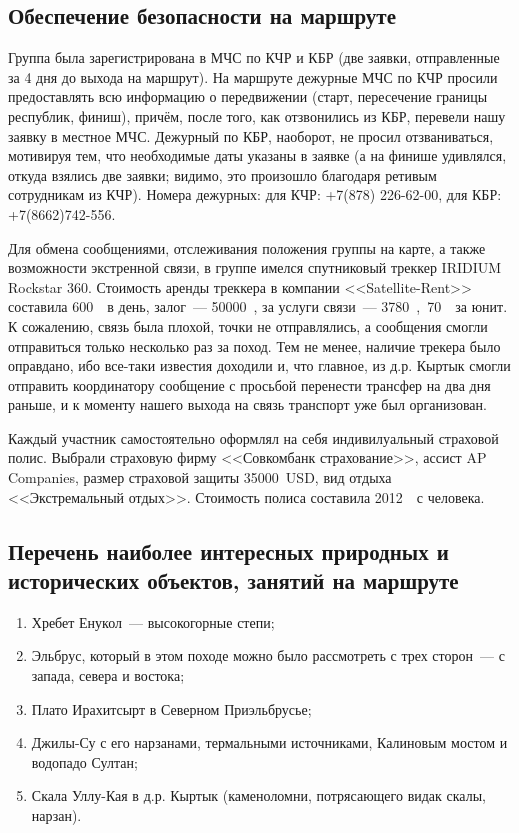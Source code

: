 \subsection{Обеспечение безопасности на маршруте}
Группа была зарегистрирована в МЧС по КЧР и КБР (две заявки, отправленные за 4 дня до выхода на маршрут). На маршруте дежурные МЧС по КЧР просили предоставлять всю информацию о передвижении (старт, пересечение границы республик, финиш), причём, после того, как отзвонились из КБР, перевели нашу заявку в местное МЧС. Дежурный по КБР, наоборот, не просил отзваниваться, мотивируя тем, что необходимые даты указаны в заявке (а на финише удивлялся, откуда взялись две заявки; видимо, это произошло благодаря ретивым сотрудникам из КЧР). Номера дежурных: для КЧР: +7(878) 226-62-00, для КБР: +7(8662)742-556.

Для обмена сообщениями, отслеживания положения группы на карте, а также возможности экстренной связи, в группе имелся спутниковый треккер IRIDIUM Rockstar 360. Стоимость аренды треккера в компании <<Satellite-Rent>> составила 600~\faRub~в день, залог~--- 50000~\faRub, за услуги связи~--- 3780~\faRuble,~70~\faRub~за юнит. К сожалению, связь была плохой, точки не отправлялись, а сообщения смогли отправиться только несколько раз за поход. Тем не менее, наличие трекера было оправдано, ибо все-таки известия доходили и, что главное, из д.р. Кыртык смогли отправить координатору сообщение с просьбой перенести трансфер на два дня раньше, и к моменту нашего выхода на связь транспорт уже был организован.

Каждый участник самостоятельно оформлял на себя индивилуальный страховой полис. Выбрали страховую фирму <<Совкомбанк страхование>>, ассист AP Companies, размер страховой защиты 35000~USD,  вид отдыха <<Экстремальный отдых>>. Стоимость полиса составила 2012~\faRuble~с человека.

\subsection{Перечень наиболее интересных природных и исторических объектов, занятий на маршруте}
\begin{enumerate}[noitemsep,topsep=0pt,parsep=0pt,partopsep=0pt]
	\item Хребет Енукол~--- высокогорные степи;
	\item Эльбрус, который в этом походе можно было рассмотреть с трех сторон~--- с запада, севера и востока;
	\item Плато Ирахитсырт в Северном Приэльбрусье;
	\item Джилы-Су с его нарзанами, термальными источниками, Калиновым мостом и водопадо Султан;
	\item Скала Уллу-Кая в д.р. Кыртык (каменоломни, потрясающего видак скалы, нарзан).
\end{enumerate}

